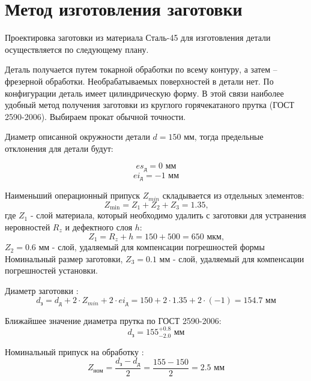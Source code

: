 \section{Метод изготовления заготовки}

Проектировка заготовки из материала Сталь-45 для изготовления детали осуществляется по следующему плану. 

Деталь получается путем токарной обработки по всему контуру, а затем – фрезерной обработки. Необрабатываемых поверхностей в детали нет. По конфигурации деталь имеет цилиндрическую форму. В этой связи наиболее удобный метод получения заготовки из круглого горячекатаного прутка (ГОСТ 2590-2006). Выбираем прокат обычной точности.

Диаметр описанной окружности детали $d = 150$ мм, тогда предельные отклонения для детали будут:

\begin{equation}
    es_\text{д} = 0    \text{ мм}
\end{equation}
\begin{equation}
    ei_\text{д} = -1    \text{ мм}
\end{equation}

Наименьший операционный припуск $Z_{min}$ складывается из отдельных элементов:
\begin{equation}
    Z_\text{min} = Z_1 + Z_2 + Z_3 = 1.35   \text{,}
\end{equation}
где $Z_1$ - слой материала, который необходимо удалить с заготовки для устранения неровностей $R_z$ и дефектного слоя $h$:
\begin{equation}
    Z_1 = R_z + h = 150 + 500 = 650 \text{ мкм,}
\end{equation}
$Z_2 = 0.6 \text{ мм}$ - слой, удаляемый для компенсации погрешностей формы
Номинальный размер заготовки, $Z_3 = 0.1 \text{ мм}$ - слой, удаляемый для компенсации погрешностей установки.\cite{metodika}

Диаметр заготовки \cite{metodika}:
\begin{equation}
    d_\text{з} = d_\text{д} + 2 \cdot Z_{min} + 2 \cdot ei_\text{д} = 150 + 2 \cdot 1.35 + 2 \cdot (-1) = 154.7    \text{ мм}
\end{equation}

Ближайшее значение диаметра прутка по ГОСТ 2590-2006:
\begin{equation}
    d_\text{з} =  155^{+0.8}_{-2.0}   \text{ мм}
\end{equation}

Номинальный припуск на обработку \cite{metodika}:
\begin{equation}
    Z_\text{ном} = \dfrac{d_\text{з} - d_\text{д}}{2} = \dfrac{155 - 150}{2} = 2.5   \text{ мм}
\end{equation}

